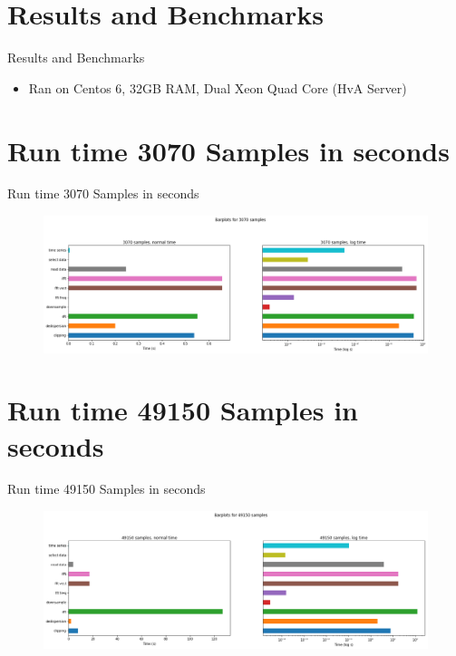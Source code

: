 \documentclass{beamer}
\begin{document}
\section{Results and Benchmarks}
\begin{frame}{Results and Benchmarks}
	\begin{itemize}
		\item Ran on Centos 6, 32GB RAM, Dual Xeon Quad Core (HvA Server)
	\end{itemize}
\end{frame}

\section{Run time 3070 Samples in seconds}
\begin{frame}{Run time 3070 Samples in seconds}
	\begin{figure}
		\includegraphics[width=\textwidth]{barchart_3070}
	\end{figure}
\end{frame}

\section{Run time 49150 Samples in seconds}
\begin{frame}{Run time 49150 Samples in seconds}
	\begin{figure}
		\includegraphics[width=\textwidth]{barchart_49150}
	\end{figure}
\end{frame}
\end{document}
